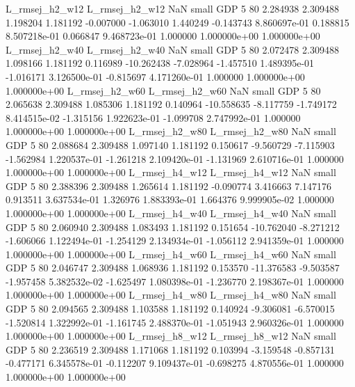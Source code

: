L_rmsej_h2_w12 L_rmsej_h2_w12                   NaN      small      GDP                 5 80 2.284938       2.309488 1.198204       1.181192   -0.007000     -1.063010      1.440249    -0.143743   8.860697e-01  0.188815 8.507218e-01     0.066847   9.468723e-01            1.000000    1.000000e+00        1.000000e+00
L_rmsej_h2_w40 L_rmsej_h2_w40                   NaN      small      GDP                 5 80 2.072478       2.309488 1.098166       1.181192    0.116989    -10.262438     -7.028964    -1.457510   1.489395e-01 -1.016171 3.126500e-01    -0.815697   4.171260e-01            1.000000    1.000000e+00        1.000000e+00
L_rmsej_h2_w60 L_rmsej_h2_w60                   NaN      small      GDP                 5 80 2.065638       2.309488 1.085306       1.181192    0.140964    -10.558635     -8.117759    -1.749172   8.414515e-02 -1.315156 1.922623e-01    -1.099708   2.747992e-01            1.000000    1.000000e+00        1.000000e+00
L_rmsej_h2_w80 L_rmsej_h2_w80                   NaN      small      GDP                 5 80 2.088684       2.309488 1.097140       1.181192    0.150617     -9.560729     -7.115903    -1.562984   1.220537e-01 -1.261218 2.109420e-01    -1.131969   2.610716e-01            1.000000    1.000000e+00        1.000000e+00
L_rmsej_h4_w12 L_rmsej_h4_w12                   NaN      small      GDP                 5 80 2.388396       2.309488 1.265614       1.181192   -0.090774      3.416663      7.147176     0.913511   3.637534e-01  1.326976 1.883393e-01     1.664376   9.999905e-02            1.000000    1.000000e+00        1.000000e+00
L_rmsej_h4_w40 L_rmsej_h4_w40                   NaN      small      GDP                 5 80 2.060940       2.309488 1.083493       1.181192    0.151654    -10.762040     -8.271212    -1.606066   1.122494e-01 -1.254129 2.134934e-01    -1.056112   2.941359e-01            1.000000    1.000000e+00        1.000000e+00
L_rmsej_h4_w60 L_rmsej_h4_w60                   NaN      small      GDP                 5 80 2.046747       2.309488 1.068936       1.181192    0.153570    -11.376583     -9.503587    -1.957458   5.382532e-02 -1.625497 1.080398e-01    -1.236770   2.198367e-01            1.000000    1.000000e+00        1.000000e+00
L_rmsej_h4_w80 L_rmsej_h4_w80                   NaN      small      GDP                 5 80 2.094565       2.309488 1.103588       1.181192    0.140924     -9.306081     -6.570015    -1.520814   1.322992e-01 -1.161745 2.488370e-01    -1.051943   2.960326e-01            1.000000    1.000000e+00        1.000000e+00
L_rmsej_h8_w12 L_rmsej_h8_w12                   NaN      small      GDP                 5 80 2.236519       2.309488 1.171068       1.181192    0.103994     -3.159548     -0.857131    -0.477171   6.345578e-01 -0.112207 9.109437e-01    -0.698275   4.870556e-01            1.000000    1.000000e+00        1.000000e+00
